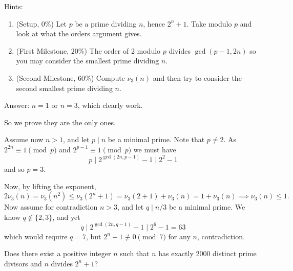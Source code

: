 \documentclass[11pt,twoside]{scrartcl}
\begin{document}
Hints:
\begin{enumerate}
    \item (Setup, $0\%$) Let $p$ be a prime dividing $n$, hence $2^n + 1$. Take modulo  $p$ and look at what the orders argument gives.
    \item (First Milestone, $20\%$) The order of 2 modulo $p$ divides $\gcd(p-1, 2n)$ so you may consider the smallest prime dividing $n$.
    \item (Second Milestone, $60\%$) Compute $\nu_3(n)$ and then try to consider the second smallest prime dividing $n$. 
\end{enumerate}
\begin{soln}
    Answer: $n=1$ or $n=3$, which clearly work.

So we prove they are the only ones.

Assume now $n > 1$, and let $p \mid n$ be a minimal prime.
Note that $p \ne 2$.
As $2^{2n} \equiv 1 \pmod p$ and $2^{p-1} \equiv 1 \pmod p$
we must have
\[ p \mid 2^{\gcd(2n, p-1)} - 1 \mid 2^2 - 1 \]
and so $p = 3$.

Now, by lifting the exponent,
\[ 2 \nu_3(n) = \nu_3(n^2) \le \nu_3(2^n+1) = \nu_3(2+1) + \nu_3(n) = 1 + \nu_3(n)
	\implies \nu_3(n) \le 1. \]
Now assume for contradiction $n > 3$, and let $q \mid n/3$ be a minimal prime.
We know $q \notin \{2,3\}$, and yet
\[ q \mid 2^{\gcd(2n, q-1)} - 1 \mid 2^6 - 1 = 63 \]
which would require $q = 7$,
but $2^n+1 \not\equiv 0 \pmod 7$ for any $n$, contradiction.
\end{soln}


\begin{problem}
     Does there exist a positive integer $n$ such that $n$ has exactly $2000$ distinct prime divisors and $n$ divides $2^n + 1$?
\end{problem}
\end{document}
